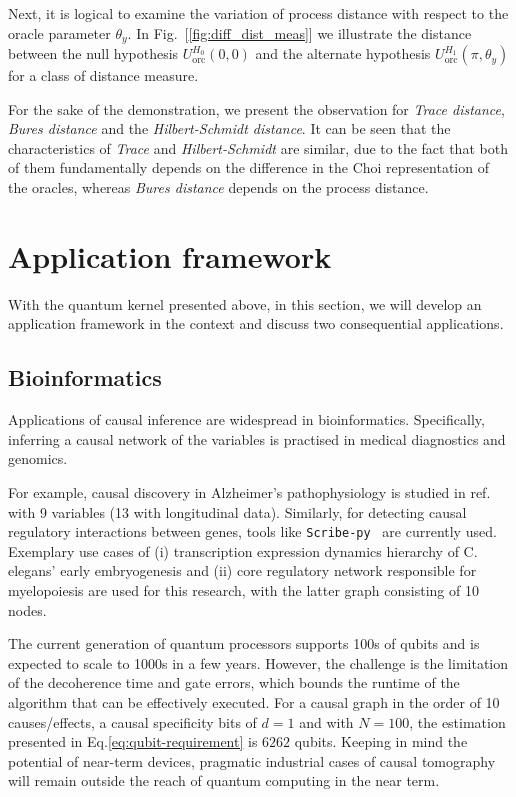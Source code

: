 \documentclass[%
 aps,
 jmp,%
 amsmath,amssymb,
 reprint,%
]{revtex4-2}
\begin{document}
Next, it is logical to examine the variation of process distance with respect to the oracle parameter $\theta_y$. In Fig.~[\ref{fig:diff_dist_meas}] we illustrate the distance between the null hypothesis $U_\textrm{orc}^{H_{0}}(0,0)$ and the alternate hypothesis $U_\textrm{orc}^{H_{1}}(\pi,\theta_y)$ for a class of distance measure. 

For the sake of the demonstration, we present the observation for \textit{Trace distance}, \textit{Bures distance} and the \textit{Hilbert-Schmidt distance}. It can be seen that the characteristics of \textit{Trace} and \textit{Hilbert-Schmidt} are similar, due to the fact that both of them fundamentally depends on the difference in the Choi representation of the oracles, whereas \textit{Bures distance} depends on the process distance.

\section{Application framework} \label{sec:application framework}

With the quantum kernel presented above, in this section, we will develop an application framework in the context and discuss two consequential applications.

\subsection{Bioinformatics}

Applications of causal inference are widespread in bioinformatics.
Specifically, inferring a causal network of the variables is practised in medical diagnostics and genomics.

For example, causal discovery in Alzheimer’s pathophysiology is studied in ref.~\cite{shen2020challenges} with 9 variables (13 with longitudinal data).
Similarly, for detecting causal regulatory interactions between genes, tools like \texttt{Scribe-py}~\cite{qiu2020inferring} are currently used.
Exemplary use cases of (i) transcription expression dynamics hierarchy of C. elegans' early embryogenesis and (ii) core regulatory network responsible for myelopoiesis are used for this research, with the latter graph consisting of 10 nodes.

The current generation of quantum processors supports 100s of qubits and is expected to scale to 1000s in a few years.
However, the challenge is the limitation of the decoherence time and gate errors, which bounds the runtime of the algorithm that can be effectively executed.
For a causal graph in the order of 10 causes/effects, a causal specificity bits of $d=1$ and with $N=100$, the estimation presented in Eq.\eqref{eq:qubit-requirement} is $6262$ qubits.
Keeping in mind the potential of near-term devices, pragmatic industrial cases of causal tomography will remain outside the reach of quantum computing in the near term.
\end{document}
